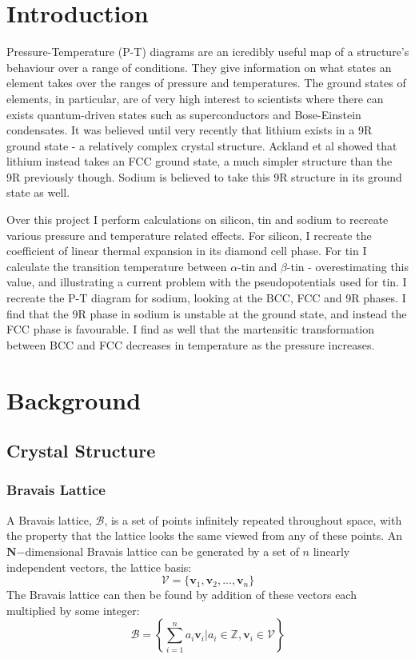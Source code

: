 \documentclass[12pt]{article}
\begin{document}
\section{Introduction}
Pressure-Temperature (P-T) diagrams are an icredibly useful map of a structure's behaviour over a range of conditions. They give information on what states an element takes over the ranges of pressure and temperatures. The ground states of elements, in particular, are of very high interest to scientists where there can exists quantum-driven states such as superconductors and Bose-Einstein condensates. It was believed until very recently that lithium exists in a 9R ground state - a relatively complex crystal structure. Ackland et al \cite{ackland2017quantum} showed that lithium instead takes an FCC ground state, a much simpler structure than the 9R previously though. Sodium is believed to take this 9R structure in its ground state as well.

Over this project I perform calculations on silicon, tin and sodium to recreate various pressure and temperature related effects. For silicon, I recreate the coefficient of linear thermal expansion in its diamond cell phase. For tin I calculate the transition temperature between $\alpha$-tin and $\beta$-tin - overestimating this value, and illustrating a current problem with the pseudopotentials used for tin. 
I recreate the P-T diagram for sodium, looking at the BCC, FCC and 9R phases. I find that the 9R phase in sodium is unstable at the ground state, and instead the FCC phase is favourable. I find as well that the martensitic transformation between BCC and FCC decreases in temperature as the pressure increases.

\section{Background}
\subsection{Crystal Structure}
\subsubsection{Bravais Lattice}
A Bravais lattice, $\mathcal{B}$, is a set of points infinitely repeated throughout space, with the property that the lattice looks the same viewed from any of these points. 
An $\mathbf{N}\mathrm{-dimensional}$ Bravais lattice can be generated by a set of $n$ linearly independent vectors, the lattice basis:
\begin{equation}\label{eq:lattice_basis}
	\mathcal{V} = \{\mathbf{v}_1, \mathbf{v}_2, ..., \mathbf{v}_n\}
\end{equation}
The Bravais lattice can then be found by addition of these vectors each multiplied by some integer:
\begin{equation}\label{eq:bravais_lattice}
	\mathcal{B} = \left \{\sum_{i=1}^n a_i\mathbf{v}_i \Big | a_i \in \mathbb{Z}, \mathbf{v}_i \in \mathcal{V}  \right \}
\end{equation}
\end{document}
